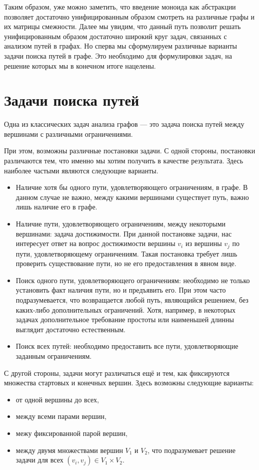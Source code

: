 Таким образом, уже можно заметить, что введение моноида как абстракции позволяет достаточно унифицированным образом смотреть на различные графы и их матрицы смежности. Далее мы увидим, что данный путь позволит решать унифицированным образом достаточно широкий круг задач, связанных с анализом путей в графах. Но сперва мы сформулируем различные варианты задачи поиска путей в графе. Это необходимо для формулировки задач, на решение которых мы в конечном итоге нацелены. 


\section{Задачи поиска путей}

Одна из классических задач анализа графов --- это задача поиска путей между вершинами с различными ограничениями.

При этом, возможны различные постановки задачи.
С одной стороны, постановки различаются тем, что именно мы хотим получить в качестве результата. Здесь наиболее частыми являются следующие варианты.

\begin{itemize}
\item Наличие хотя бы одного пути, удовлетворяющего ограничениям, в графе. В данном случае не важно, между какими вершинами существует путь, важно лишь наличие его в графе.

\item Наличие пути, удовлетворяющего ограничениям, между некоторыми вершинами: задача достижимости.
      При данной постановке задачи, нас интересует ответ на вопрос достижимости вершины $v_i$ из вершины $v_j$ по пути, удовлетворяющему ограничениям.
      Такая постановка требует лишь проверить существование пути, но не его предоставления в явном виде.

\item Поиск одного пути, удовлетворяющего ограничениям: необходимо не только установить факт наличия пути, но и  предъявить его. При этом часто подразумевается, что возвращается любой путь, являющийся решением, без каких-либо дополнительных ограничений. Хотя, например, в некоторых задачах дополнительное требование простоты или наименьшей длинны выглядит достаточно естественным.

\item Поиск всех путей: необходимо предоставить все пути, удовлетворяющие заданным ограничениям.
\end{itemize}

С другой стороны, задачи могут различаться ещё и тем, как фиксируются множества стартовых и конечных вершин.
Здесь возможны следующие варианты:
\begin{itemize}
\item от одной вершины до всех,
\item между всеми парами вершин,
\item межу фиксированной парой вершин,
\item между двумя множествами вершин $V_1$ и $V_2$, что подразумевает решение задачи для всех $(v_i,v_j) \in V_1 \times V_2$.
\end{itemize}

